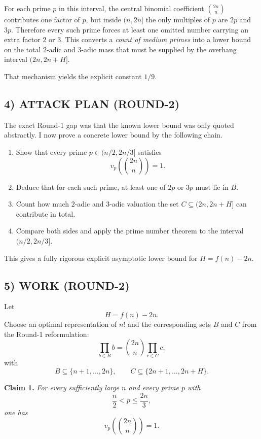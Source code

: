 For each prime $p$ in this interval, the central binomial coefficient ${2n\choose n}$ contributes one factor of $p$, but inside $(n,2n]$ the only multiples of $p$ are $2p$ and $3p$.
Therefore every such prime forces at least one omitted number carrying an extra factor $2$ or $3$.
This converts a \emph{count of medium primes} into a lower bound on the total $2$-adic and $3$-adic mass that must be supplied by the overhang interval $(2n,2n+H]$.

That mechanism yields the explicit constant $1/9$.

\subsection*{4) ATTACK PLAN (ROUND-2)}

The exact Round-1 gap was that the known lower bound was only quoted abstractly.
I now prove a concrete lower bound by the following chain.

\begin{enumerate}
\item Show that every prime $p\in(n/2,2n/3]$ satisfies
\[
v_p\!\left({2n\choose n}\right)=1.
\]

\item Deduce that for each such prime, at least one of $2p$ or $3p$ must lie in $B$.

\item Count how much $2$-adic and $3$-adic valuation the set $C\subseteq(2n,2n+H]$ can contribute in total.

\item Compare both sides and apply the prime number theorem to the interval $(n/2,2n/3]$.
\end{enumerate}

This gives a fully rigorous explicit asymptotic lower bound for $H=f(n)-2n$.

\subsection*{5) WORK (ROUND-2)}

Let
\[
H=f(n)-2n.
\]
Choose an optimal representation of $n!$ and the corresponding sets $B$ and $C$ from the Round-1 reformulation:
\[
\prod_{b\in B} b={2n\choose n}\prod_{c\in C} c,
\]
with
\[
B\subseteq \{n+1,\dots,2n\},\qquad
C\subseteq \{2n+1,\dots,2n+H\}.
\]

\medskip
\noindent\textbf{Claim 1.}
\emph{For every sufficiently large $n$ and every prime $p$ with}
\[
\frac{n}{2}<p\le \frac{2n}{3},
\]
\emph{one has}
\[
v_p\!\left({2n\choose n}\right)=1.
\]

